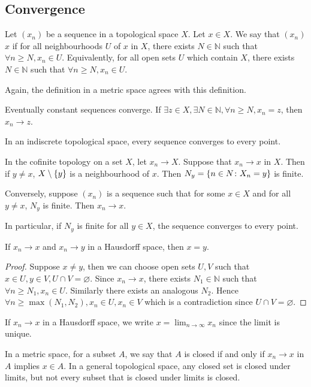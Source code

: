 \subsection{Convergence}
\begin{definition}
	Let \( (x_n) \) be a sequence in a topological space \( X \).
	Let \( x \in X \).
	We say that \( (x_n) \)  \( x \) if for all neighbourhoods \( U \) of \( x \) in \( X \), there exists \( N \in \mathbb N \) such that \( \forall n \geq N, x_n \in U \).
	Equivalently, for all open sets \( U \) which contain \( X \), there exists \( N \in \mathbb N \) such that \( \forall n \geq N, x_n \in U \).
\end{definition}
\begin{remark}
	Again, the definition in a metric space agrees with this definition.
\end{remark}
\begin{example}
	Eventually constant sequences converge.
	If \( \exists z \in X, \exists N \in \mathbb N, \forall n \geq N, x_n = z \), then \( x_n \to z \).
\end{example}
\begin{example}
	In an indiscrete topological space, every sequence converges to every point.
\end{example}
\begin{example}
	In the cofinite topology on a set \( X \), let \( x_n \to X \).
	Suppose that \( x_n \to x \) in \( X \).
	Then if \( y \neq x \), \( X \setminus \qty{y} \) is a neighbourhood of \( x \).
	Then \( N_y = \qty{n \in N \colon X_n = y} \) is finite.

	Conversely, suppose \( (x_n) \) is a sequence such that for some \( x \in X \) and for all \( y \neq x \), \( N_y \) is finite.
	Then \( x_n \to x \).

	In particular, if \( N_y \) is finite for all \( y \in X \), the sequence converges to every point.
\end{example}
\begin{proposition}
	If \( x_n \to x \) and \( x_n \to y \) in a Hausdorff space, then \( x = y \).
\end{proposition}
\begin{proof}
	Suppose \( x \neq y \), then we can choose open sets \( U, V \) such that \( x \in U, y \in V, U \cap V = \varnothing \).
	Since \( x_n \to x \), there exists \( N_1 \in \mathbb N \) such that \( \forall n \geq N_1, x_n \in U \).
	Similarly there exists an analogous \( N_2 \).
	Hence \( \forall n \geq \max(N_1, N_2), x_n \in U, x_n \in V \) which is a contradiction since \( U \cap V = \varnothing \).
\end{proof}
\begin{remark}
	If \( x_n \to x \) in a Hausdorff space, we write \( x = \lim_{n \to \infty} x_n \) since the limit is unique.
\end{remark}
\begin{remark}
	In a metric space, for a subset \( A \), we say that \( A \) is closed if and only if \( x_n \to x \) in \( A \) implies \( x \in A \).
	In a general topological space, any closed set is closed under limits, but not every subset that is closed under limits is closed.
\end{remark}

